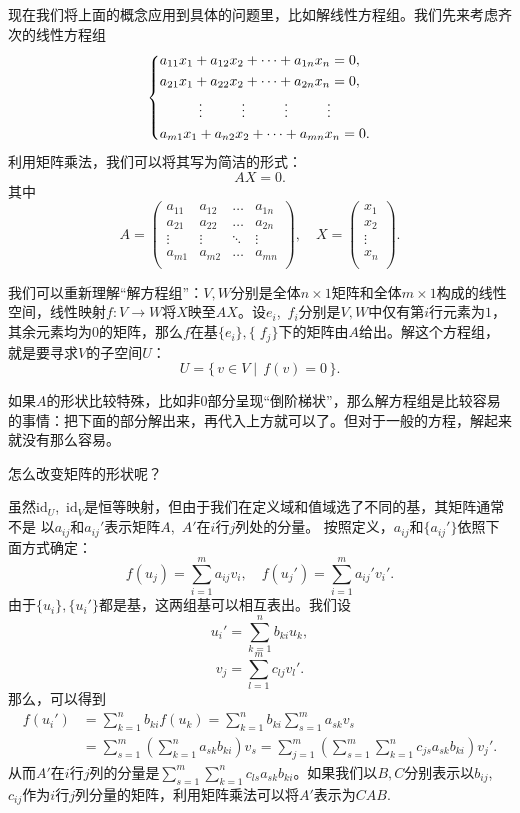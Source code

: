 现在我们将上面的概念应用到具体的问题里，比如解线性方程组。我们先来考虑齐次的线性方程组
\[
    \begin{dcases}
        a_{11}x_1+a_{12}x_2+\cdots+a_{1n}x_n=0,                               \\
        a_{21}x_1+a_{22}x_2+\cdots+a_{2n}x_n=0,                               \\
        \mbox{}\hfill\vdots\hfill\vdots \hfill\vdots\hfill\vdots\hfill\mbox{} \\
        a_{m1}x_1+a_{n2}x_2+\cdots +a_{mn}x_n=0.
    \end{dcases}
\]
利用矩阵乘法，我们可以将其写为简洁的形式：
\[AX=0.\]
其中
\[A = \begin{pmatrix}
        a_{11} & a_{12} & \ldots & a_{1n} \\
        a_{21} & a_{22} & \ldots & a_{2n} \\
        \vdots & \vdots & \ddots & \vdots \\
        a_{m1} & a_{m2} & \ldots & a_{mn} \\
    \end{pmatrix},\quad 
    X = \begin{pmatrix}
        x_1    \\
        x_2    \\
        \vdots \\
        x_n    \\
    \end{pmatrix}.\]

我们可以重新理解“解方程组”：$V,W$分别是全体$n\times 1$矩阵和全体$m\times 1$构成的线性空间，线性映射$f:V\to W$将$X$映至$AX$。设$e_i$,~$f_i$分别是$V,W$中仅有第$i$行元素为$1$，其余元素均为$0$的矩阵，那么$f$在基$\{e_i\},\{\;\!f_j\}$下的矩阵由$A$给出。解这个方程组，就是要寻求$V$的子空间$U$：
\[U=\bigl\{\,v\in V\mid\, f(v)=0\,\bigr\}.\]

如果$A$的形状比较特殊，比如非$0$部分呈现“倒阶梯状”，那么解方程组是比较容易的事情：把下面的部分解出来，再代入上方就可以了。但对于一般的方程，解起来就没有那么容易。

怎么改变矩阵的形状呢？

虽然$\mathrm{id}_U$,~$\mathrm{id}_V$是恒等映射，但由于我们在定义域和值域选了不同的基，其矩阵通常不是
以$a_{ij}$和$a_{ij}'$表示矩阵$A$,~$A'$在$i$行$j$列处的分量。
按照定义，$a_{ij}$和$\{a_{ij}'\}$依照下面方式确定：
\[
    f(u_j)=\sum_{i=1}^ma_{ij}v_i,\quad f(u_j')=\sum_{i=1}^ma_{ij}'v_i'
    .\]
由于$\{u_i\},\{u_i'\}$都是基，这两组基可以相互表出。我们设
\[
    u_i'=\sum_{k=1}^nb_{ki}u_{k}
    ,\]
\[
    v_j=\sum_{l=1}^mc_{lj}v_l'
    .\]
那么，可以得到
\begin{align*}
    f(u_i') & =\sum_{k=1}^nb_{ki}f(u_k)
    =\sum_{k=1}^nb_{ki}\sum_{s=1}^ma_{sk}v_s             \\
            & =\sum_{s=1}^m\left( \sum_{k=1}^na_{sk}b_{ki} \right) v_s
    =\sum_{j=1}^m\left( \sum_{s=1}^m\sum_{k=1}^nc_{js}a_{sk}b_{ki} \right) v_j'.
\end{align*}
从而$A'$在$i$行$j$列的分量是$\sum_{s=1}^m\sum_{k=1}^nc_{ls}a_{sk}b_{ki}$。如果我们以$B,C$分别表示以$b_{ij}$,~$c_{ij}$作为$i$行$j$列分量的矩阵，利用矩阵乘法可以将$A'$表示为$CAB$.